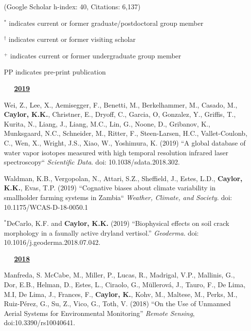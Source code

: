 \documentclass[10pt]{report}
\begin{document}
{\small (Google Scholar h-index: 40, Citations: 6,137)}
\vspace*{.1in}

{ \small $^{*}$ indicates current or former graduate/postdoctoral group member}

{ \small $^{\dagger}$ indicates current or former visiting scholar}

{ \small $^{+}$ indicates current or former undergraduate group member}


{ PP indicates pre-print publication}

\vspace*{.1in}

\mbox{\ \ \ \underline{\textbf{2019}}}

\begin{etaremune}

\item Wei, Z., Lee, X., Aemisegger, F., Benetti, M., Berkelhammer, M., Casado, M., \textbf{Caylor, K.K.}, Christner, E., Dryoff, C., Garcia, O, Gonzalez, Y., Griffis, T., Kurita, N., Liang, J., Liang, M.C., Lin, G., Noone, D., Gribanov, K., Munksgaard, N.C., Schneider, M., Ritter, F., Steen-Larsen, H.C., Vallet-Coulonb, C., Wen, X., Wright, J.S., Xiao, W., Yoshimura, K. (2019) ``A global database of water vapor isotopes measured with high temporal resolution infrared laser spectroscopy`` {\em Scientific Data}. doi: 10.1038/sdata.2018.302.

\item Waldman, K.B., Vergopolan, N., Attari, S.Z., Sheffield, J., Estes, L.D., \textbf{Caylor, K.K.}, Evas, T.P. (2019) ``Cognative biases about climate variability in smallholder farming systems in Zambia`` {\em Weather, Climate, and Society}. doi: 10.1175/WCAS-D-18-0050.1

\item $^{*}$DeCarlo, K.F. and \textbf{Caylor, K.K.} (2019) ``Biophysical effects on soil crack morphology in a faunally active dryland vertisol.'' {\em Geoderma}. doi: 10.1016/j.geoderma.2018.07.042.

\mbox{\ \ \ \underline{\textbf{2018}}}

\item Manfreda, S. McCabe, M., Miller, P., Lucas, R.,  Madrigal, V.P., Mallinis, G., Dor, E.B., Helman, D., Estes, L., Ciraolo, G., Müllerová, J., Tauro, F., De Lima, M.I, De Lima, J., Frances, F., \textbf{Caylor, K.}, Kohv, M., Maltese, M., Perks, M., Ruiz-Pérez, G., Su, Z., Vico, G., Toth, V. (2018) ``On the Use of Unmanned Aerial Systems for Environmental Monitoring'' {\em Remote Sensing}, doi:10.3390/rs10040641.


\end{etaremune}
\end{document}
